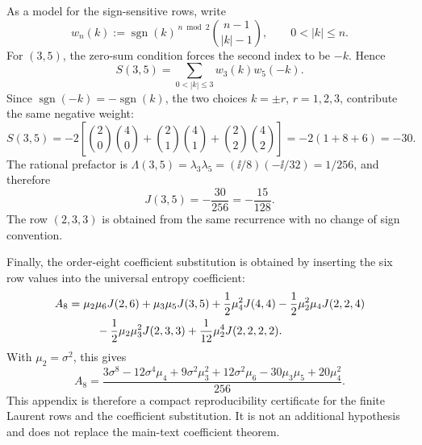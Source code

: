 As a model for the sign-sensitive rows, write
\[
w_n(k):=\operatorname{sgn}(k)^{\,n\bmod 2}
\binom{n-1}{|k|-1},\qquad 0<|k|\le n .
\]
For \((3,5)\), the zero-sum condition forces the second index to be \(-k\).
Hence
\[
S(3,5)
=\sum_{0<|k|\le3}w_3(k)w_5(-k).
\]
Since \(\operatorname{sgn}(-k)=-\operatorname{sgn}(k)\), the two choices
\(k=\pm r\), \(r=1,2,3\), contribute the same negative weight:
\[
S(3,5)
=-2\left[
\binom20\binom40+\binom21\binom41+\binom22\binom42
\right]
=-2(1+8+6)=-30.
\]
The rational prefactor is
\(\Lambda(3,5)=\lambda_3\lambda_5=(\ii/8)(-\ii/32)=1/256\), and therefore
\[
J(3,5)=-\frac{30}{256}=-\frac{15}{128}.
\]
The row \((2,3,3)\) is obtained from the same recurrence with no change of
sign convention.

Finally, the order-eight coefficient substitution is obtained by inserting
the six row values into the universal entropy coefficient:
\[
\begin{aligned}
A_8&=\mu_2\mu_6J(2,6)+\mu_3\mu_5J(3,5)
+\frac12\mu_4^2J(4,4)
-\frac12\mu_2^2\mu_4J(2,2,4)\\
&\hspace{2.5em}
-\frac12\mu_2\mu_3^2J(2,3,3)
+\frac1{12}\mu_2^4J(2,2,2,2).
\end{aligned}
\]
With \(\mu_2=\sigma^2\), this gives
\[
A_8=
\frac{3\sigma^8-12\sigma^4\mu_4+9\sigma^2\mu_3^2
+12\sigma^2\mu_6-30\mu_3\mu_5+20\mu_4^2}{256}.
\]
This appendix is therefore a compact reproducibility certificate for the
finite Laurent rows and the coefficient substitution.  It is not an
additional hypothesis and does not replace the main-text coefficient theorem.
